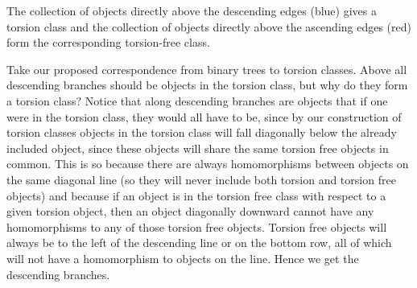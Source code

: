 \documentclass{article}
\begin{document}
\begin{center}
\end{center}
\begin{thm}
The collection of objects directly above the descending edges (blue) gives a torsion class and the collection of objects directly above the ascending edges (red) form the corresponding torsion-free class. 

\end{thm}
 Take our proposed correspondence from binary trees to torsion classes. Above all descending branches should be objects in the torsion class, but why do they form a torsion class? Notice that along descending branches are objects that if one were in the torsion class, they would all have to be, since by our construction of torsion classes objects in the torsion class will fall diagonally below the already included object, since these objects will share the same torsion free objects in common. This is so because there are always homomorphisms between objects on the same diagonal line (so they will never include both torsion and torsion free objects) and because if an object is in the torsion free class with respect to a given torsion object, then an object diagonally downward cannot have any homomorphisms to any of those torsion free objects. Torsion free objects will always be to the left of the descending line or on the bottom row, all of which will not have a homomorphism to objects on the line. Hence we get the descending branches. \\
\end{document}
